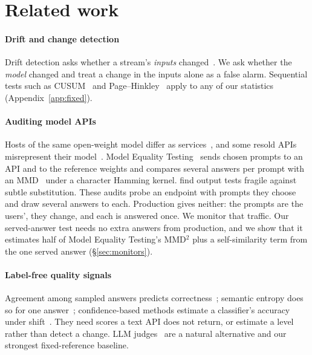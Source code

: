 \documentclass{article}
\begin{document}
\section{Related work}

\paragraph{Drift and change detection}
Drift detection asks whether a stream's \emph{inputs} changed~\citep{gama2014survey,
rabanser2019failing,lipton2018detecting}. We ask whether the \emph{model} changed
and treat a change in the inputs alone as a false alarm. Sequential tests such as
CUSUM~\citep{page1954continuous} and Page--Hinkley~\citep{hinkley1971inference}
apply to any of our statistics (Appendix~\ref{app:fixed}).

\paragraph{Auditing model APIs}
Hosts of the same open-weight model differ as services~\citep{li2026sameservice},
and some resold APIs misrepresent their model~\citep{zhang2026shadow}. Model
Equality Testing~\citep{gao2025model} sends chosen prompts to an API and to the
reference weights and compares several answers per prompt with an
MMD~\citep{gretton2012kernel} under a character Hamming kernel.
\citet{cai2025substitution} find output tests fragile against subtle substitution.
These audits probe an endpoint with prompts they choose and draw several answers
to each. Production gives neither: the prompts are the users', they change, and
each is answered once. We monitor that traffic. Our served-answer test needs no
extra answers from production, and we show that it estimates half of Model
Equality Testing's MMD$^2$ plus a self-similarity term from the one served answer
(\S\ref{sec:monitors}).

\paragraph{Label-free quality signals}
Agreement among sampled answers predicts correctness~\citep{wang2023selfconsistency,
manakul2023selfcheckgpt}; semantic entropy does so for one
answer~\citep{kuhn2023semantic}; confidence-based methods estimate a classifier's
accuracy under shift~\citep{garg2022atc,deng2021labels}. They need scores a text
API does not return, or estimate a level rather than detect a change. LLM
judges~\citep{zheng2023judging} are a natural alternative and our strongest
fixed-reference baseline.
\end{document}
